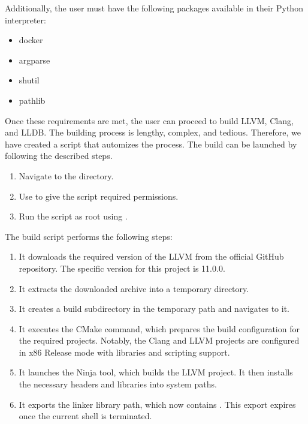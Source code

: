 \documentclass[12pt,a4paper]{report}
\begin{document}
Additionally, the user must have the following packages available in their 
Python interpreter:

\begin{itemize}
  \item docker
  \item argparse
  \item shutil
  \item pathlib
\end{itemize}

Once these requirements are met, the user can proceed to build LLVM, Clang, 
and LLDB. 
The building process is lengthy, complex, and tedious. 
Therefore, we have created a script that automizes the process. 
The build can be launched by following the described steps.

\begin{enumerate}
  \item Navigate to the  directory.
  \item Use  to give the script required 
  permissions.
  \item Run the script as root using .
\end{enumerate}

The build script performs the following steps:

\begin{enumerate}
  \item It downloads the required version of the LLVM from the official 
  GitHub repository. 
  The specific version for this project is 11.0.0.
  \item It extracts the downloaded archive into a temporary directory.
  \item It creates a build subdirectory in the temporary path and navigates 
  to it.
  \item It executes the CMake command, which prepares the build 
  configuration for the required projects. 
  Notably, the Clang and LLVM projects are configured in x86 Release mode 
  with libraries and scripting support.
  \item It launches the Ninja tool, which builds the LLVM project. 
  It then installs the necessary headers and libraries into system paths.
  \item It exports the linker library path, which now contains 
  . 
  This export expires once the current shell is terminated.
\end{enumerate}
\end{document}
